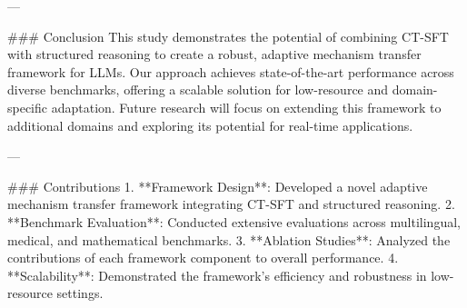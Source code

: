 ---

### Conclusion
This study demonstrates the potential of combining CT-SFT with structured reasoning to create a robust, adaptive mechanism transfer framework for LLMs. Our approach achieves state-of-the-art performance across diverse benchmarks, offering a scalable solution for low-resource and domain-specific adaptation. Future research will focus on extending this framework to additional domains and exploring its potential for real-time applications.

---

### Contributions
1. **Framework Design**: Developed a novel adaptive mechanism transfer framework integrating CT-SFT and structured reasoning.
2. **Benchmark Evaluation**: Conducted extensive evaluations across multilingual, medical, and mathematical benchmarks.
3. **Ablation Studies**: Analyzed the contributions of each framework component to overall performance.
4. **Scalability**: Demonstrated the framework's efficiency and robustness in low-resource settings.